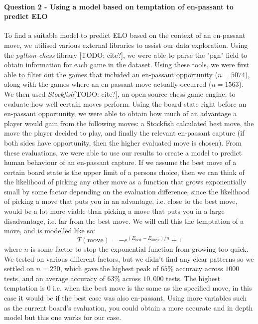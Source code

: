 \documentclass[10pt,a4paper,twocolumn]{article}
\begin{document}
\paragraph{Question 2 - Using a model based on temptation of en-passant to predict ELO}
To find a suitable model to predict ELO based on the context of an en-passant move, we utilised various external libraries to assist our data exploration. Using the \textit{python-chess} library [TODO: cite?], we were able to parse the "pgn" field to obtain information for each game in the dataset. Using these tools, we were first able to filter out the games that included an en-passant opportunity ($n=5074$), along with the games where an en-passant move actually occurred ($n=1563$). We then used \textit{Stockfish}[TODO: cite?], an open source chess game engine, to evaluate how well certain moves perform. Using the board state right before an en-passant opportunity, we were able to obtain how much of an advantage a player would gain from the following moves: a Stockfish calculated best move, the move the player decided to play, and finally the relevant en-passant capture (if both sides have opportunity, then the higher evaluated move is chosen).\newline
From these evaluations, we were able to use our results to create a model to predict human behaviour of an en-passant capture. If we assume the best move of a certain board state is the upper limit of a persons choice, then we can think of the likelihood of picking any other move as a function that grows exponentially small by some factor depending on the evaluation difference, since the likelihood of picking a move that puts you in an advantage, i.e. close to the best move, would be a lot more viable than picking a move that puts you in a large disadvantage, i.e. far from the best move. We will call this the temptation of a move, and is modelled like so:
$$T(\text{move})= -e^{(E_{\text{best}} - E_{\text{move}})/{n}} + 1$$
where $n$ is some factor to stop the exponential function from growing too quick. We tested on various different factors, but we didn't find any clear patterns so we settled on $n=220$, which gave the highest peak of $65\%$ accuracy across $1000$ tests, and an average accuracy of $63\%$ across $10,000$ tests. The highest temptation is $0$ i.e. when the best move is the same as the specified move, in this case it would be if the best case was also en-passant. Using more variables such as the current board's evaluation, you could obtain a more accurate and in depth model but this one works for our case. \newline
\end{document}
